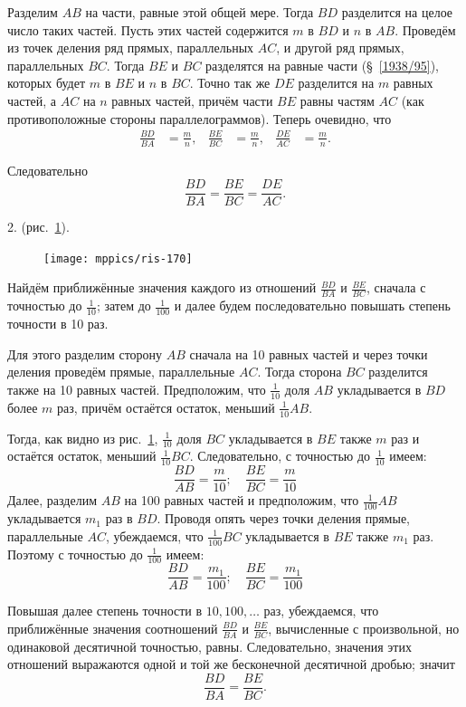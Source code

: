 \documentclass[twoside]{book}
\begin{document}
Разделим $AB$ на части, равные этой общей мере.
Тогда $BD$ разделится на целое число таких частей.
Пусть этих частей содержится $m$ в $BD$ и $n$ в $AB$.
Проведём из точек деления ряд прямых, параллельных $AC$, и другой ряд прямых, параллельных $BC$.
Тогда $BE$ и $BC$ разделятся на равные части (§~\ref{1938/95}), которых будет $m$ в $BE$ и $n$ в $BC$.
Точно так же $DE$ разделится на $m$ равных частей, а $AC$ на $n$ равных частей, причём части $BE$ равны частям $AC$ (как противоположные стороны параллелограммов).
Теперь очевидно, что
\begin{align*}
\frac{BD}{BA}&=\frac mn,
&
\frac{BE}{BC}&=\frac mn,
&
\frac{DE}{AC}&=\frac mn.
\end{align*}



Следовательно
\[\frac{BD}{BA}=\frac{BE}{BC}=\frac{DE}{AC}.\]

2.  (рис.~\ref{1938/ris-170}).

\begin{figure}
\centering
\texttt{[image: mppics/ris-170]}
\caption{}\label{1938/ris-170}
\end{figure}

Найдём приближённые значения каждого из отношений $\frac{BD}{BA}$ и $\frac{BE}{BC}$, сначала с точностью до $\tfrac1{10}$;
затем до $\tfrac1{100}$ и далее будем последовательно повышать степень точности в 10 раз.

Для этого разделим сторону $AB$ сначала на 10 равных частей и через точки деления проведём прямые, параллельные $AC$.
Тогда сторона $BC$ разделится также на 10 равных частей.
Предположим, что $\tfrac1{10}$ доля $AB$ укладывается в $BD$ более $m$
раз, причём остаётся остаток, меньший $\tfrac1{10}AB$.

Тогда, как видно из рис.~\ref{1938/ris-170}, $\tfrac1{10}$ доля $BC$ укладывается в $BE$ также $m$ раз и остаётся остаток, меньший $\tfrac1{10}BC$.
Следовательно, с точностью до $\tfrac1{10}$ имеем:
\[\frac{BD}{AB}=\frac{m}{10}; 
\quad
\frac{BE}{BC}=\frac{m}{10}\]
Далее, разделим $AB$ на 100 равных частей и предположим, что $\tfrac1{100}AB$ укладывается $m_1$ раз в $BD$.
Проводя опять через точки деления прямые, параллельные $AC$, убеждаемся, что $\tfrac1{100}BC$ укладывается в $BE$ также $m_1$ раз.
Поэтому с точностью до $\tfrac1{100}$ имеем:
\[\frac{BD}{AB}=\frac{m_1}{100}; 
\quad
\frac{BE}{BC}=\frac{m_1}{100}\]

Повышая далее степень точности в $10,100,\dots$ раз, убеждаемся, что приближённые значения соотношений $\frac{BD}{BA}$ и $\frac{BE}{BC}$, вычисленные с произвольной, но одинаковой десятичной точностью, равны.
Следовательно, значения этих отношений выражаются одной и той же бесконечной десятичной дробью;
значит
\[\frac{BD}{BA}=\frac{BE}{BC}.\]
\end{document}
